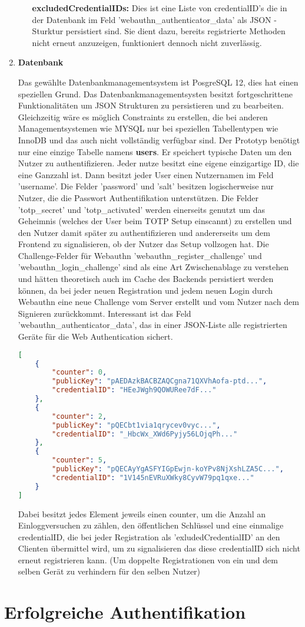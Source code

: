 \begin{enumerate}
\begin{itemize}
\textbf{excludedCredentialIDs:} Dies ist eine Liste von credentialID's die in der Datenbank im Feld 'webauthn\_authenticator\_data' als JSON - Sturktur persistiert sind. Sie dient dazu, bereits registrierte Methoden nicht erneut anzuzeigen, funktioniert dennoch nicht zuverlässig.
\end{itemize}
\newpage

\item \textbf{Datenbank}

Das gewählte Datenbankmanagementsystem ist PosgreSQL 12, dies hat einen speziellen Grund. Das Datenbankmanagementsysten besitzt fortgeschrittene Funktionalitäten um JSON Strukturen zu persistieren und zu bearbeiten. Gleichzeitig wäre es möglich Constraints zu erstellen, die bei anderen Managementsystemen wie MYSQL nur bei speziellen Tabellentypen wie InnoDB und das auch nicht vollständig verfügbar sind. Der Prototyp benötigt nur eine einzige Tabelle namens \textbf{users}. Er speichert typische Daten um den Nutzer zu authentifizieren. Jeder nutze besitzt eine eigene einzigartige ID, die eine Ganzzahl ist. Dann besitzt jeder User einen Nutzernamen im Feld 'username'. Die Felder 'password' und 'salt' besitzen logischerweise nur Nutzer, die die Passwort Authentifikation unterstützen. Die Felder 'totp\_secret' und 'totp\_activated' werden einerseits genutzt um das Geheimnis (welches der User beim TOTP Setup einscannt) zu erstellen und den Nutzer damit später zu authentifizieren und andererseits um dem Frontend zu signalisieren, ob der Nutzer das Setup vollzogen hat. Die Challenge-Felder für Webauthn 'webauthn\_register\_challenge' und 'webauthn\_login\_challenge' sind als eine Art Zwischenablage zu verstehen und hätten theoretisch auch im Cache des Backends persistiert werden können, da bei jeder neuen Registration und jedem neuen Login durch Webauthn eine neue Challenge vom Server erstellt und vom Nutzer nach dem Signieren zurückkommt. Interessant ist das Feld 'webauthn\_authenticator\_data', das in einer JSON-Liste alle registrierten Geräte für die Web Authentication sichert.

 \begin{lstlisting}[language=json,firstnumber=1]
[
    {
        "counter": 0,
        "publicKey": "pAEDAzkBACBZAQCgna71QXVhAofa-ptd...",
        "credentialID": "HEeJWgh9QOWURee7dF..."
    },
    {
        "counter": 2,
        "publicKey": "pQECbt1via1qrycev0vyc...",
        "credentialID": "_HbcWx_XWd6Pyjy56LOjqPh..."
    },
    {
        "counter": 5,
        "publicKey": "pQECAyYgASFYIGpEwjn-koYPv8NjXshLZA5C...",
        "credentialID": "1V145nEVRuXWky8CyvW79pq1qxe..."
    }
]
\end{lstlisting}

Dabei besitzt jedes Element jeweils einen counter, um die Anzahl an Einloggversuchen zu zählen, den öffentlichen Schlüssel und eine einmalige credentialID, die bei jeder Registration als 'exludedCredentialID' an den Clienten übermittel wird, um zu signalisieren das diese credentialID sich nicht erneut registrieren kann. (Um doppelte Registrationen von ein und dem selben Gerät zu verhindern für den selben Nutzer)
\end{enumerate}

\section{Erfolgreiche Authentifikation}



